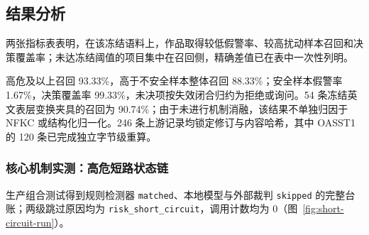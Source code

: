 \subsection{结果分析}

两张指标表表明，在该冻结语料上，作品取得较低假警率、较高扰动样本召回和决策覆盖率；未达冻结阈值的项目集中在召回侧，精确差值已在表中一次性列明。

高危及以上召回 93.33\%，高于不安全样本整体召回 88.33\%；安全样本假警率 1.67\%，决策覆盖率 99.33\%，未决项按失效闭合归约为拒绝或询问。54 条冻结英文表层变换夹具的召回为 90.74\%；由于未进行机制消融，该结果不单独归因于 NFKC 或结构化归一化。246 条上游记录均锁定修订与内容哈希，其中 OASST1 的 120 条已完成独立字节级重算。

\subsubsection{核心机制实测：高危短路状态链}

生产组合测试得到规则检测器 \verb|matched|、本地模型与外部裁判 \verb|skipped| 的完整台账；两级跳过原因均为 \verb|risk_short_circuit|，调用计数均为 0（图~\ref{fig:short-circuit-run}）。

